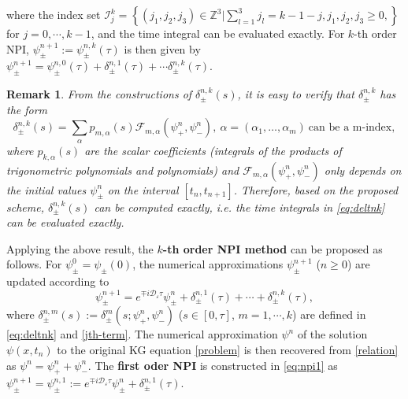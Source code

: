 \documentclass[final,leqno,showlabe]{siamltex}
\newtheorem{rmk}{Remark}[section]
\begin{document}
where the index set $\mathcal{I}_j^k=\left\{(j_1,j_2,j_3)\in\mathbb{Z}^3|\sum\limits_{l=1}^3j_l=k-1-j,
j_1,j_2,j_3\ge0,\right\}$ for $j=0,\cdots,k-1$, and the time integral can be evaluated exactly.
For $k$-th order NPI, $\psi_\pm^{n+1}:=\psi_\pm^{n,k}(\tau)$ is then given by
$\psi_\pm^{n+1}=\psi_\pm^{n,0}(\tau)+\delta_{\pm}^{n,1}(\tau)+\cdots\delta_{\pm}^{n,k}(\tau)$.
\begin{rmk}
From the constructions of $\delta_{\pm}^{n,k}(s)$, it is easy to verify that $\delta_{\pm}^{n,k}$ has the form
\begin{equation*}
\delta_{\pm}^{n,k}(s)=\sum_\alpha p_{m,\alpha}(s)\mathcal{F}_{m,\alpha}(\psi_+^n,\psi_-^n),\ \alpha=(\alpha_1,\dots,\alpha_m)\ \text{can be a m-index},
\end{equation*}
where $p_{k,\alpha}(s)$ are the scalar coefficients (integrals of the products of trigonometric polynomials and polynomials) and $\mathcal{F}_{m,\alpha}(\psi_+^n,\psi_-^n)$ only depends on the initial values $\psi_\pm^n$ on the interval $[t_n,t_{n+1}]$. Therefore, based on the proposed scheme, $\delta_{\pm}^{n,k}(s)$ can be computed exactly, i.e. the time integrals in \eqref{eq:deltnk} can be evaluated exactly.
\end{rmk}

Applying the above result, the {\bf $k$-th order NPI method} can be proposed as follows. For $\psi_\pm^0=\psi_\pm(0)$, the numerical approximations $\psi_\pm^{n+1}$ ($n\ge0$) are updated according to
\begin{equation}
\psi_\pm^{n+1}=e^{\mp i\mathcal{D}_\varepsilon \tau}\psi_\pm^{n}+\delta_{\pm}^{n,1}(\tau)+\cdots+\delta_{\pm}^{n,k}(\tau),\label{knpi}
\end{equation}
where $\delta_\pm^{n,m}(s):=\delta_\pm^m(s;\psi_+^n,\psi_-^n)$ ($s\in[0,\tau]$, $m=1,\cdots,k$) are defined in \eqref{eq:deltnk} and \eqref{jth-term}. The numerical approximation $\psi^n$ of the solution $\psi(x,t_n)$ to the original KG equation \eqref{problem} is then recovered from  \eqref{relation} as $\psi^n=\psi_+^n+\psi_-^n$. The {\bf first oder NPI} is constructed in \eqref{eq:npi1} as $\psi_{\pm}^{n+1}=\psi_{\pm}^{n,1}:=e^{\mp i\mathcal{D}_\varepsilon \tau}\psi_\pm^{n}+\delta_{\pm}^{n,1}(\tau)$.
\end{document}
